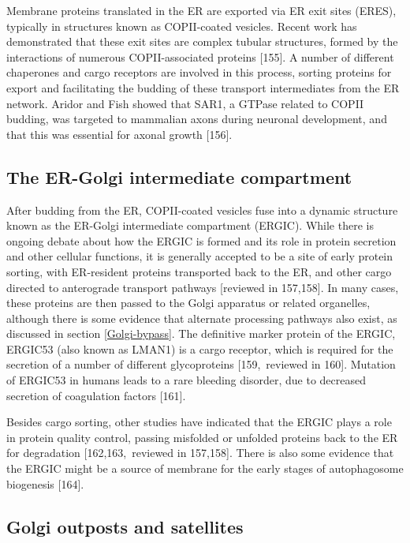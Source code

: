 \documentclass[
  12pt,
  a4paper,
]{book}
\begin{document}
Membrane proteins translated in the ER are exported via ER exit sites (ERES), typically in structures known as COPII-coated vesicles. Recent work has demonstrated that these exit sites are complex tubular structures, formed by the interactions of numerous COPII-associated proteins {[}155{]}. A number of different chaperones and cargo receptors are involved in this process, sorting proteins for export and facilitating the budding of these transport intermediates from the ER network. Aridor and Fish showed that SAR1, a GTPase related to COPII budding, was targeted to mammalian axons during neuronal development, and that this was essential for axonal growth {[}156{]}.

\subsection{The ER-Golgi intermediate compartment}\label{the-er-golgi-intermediate-compartment}

After budding from the ER, COPII-coated vesicles fuse into a dynamic structure known as the ER-Golgi intermediate compartment (ERGIC). While there is ongoing debate about how the ERGIC is formed and its role in protein secretion and other cellular functions, it is generally accepted to be a site of early protein sorting, with ER-resident proteins transported back to the ER, and other cargo directed to anterograde transport pathways {[}reviewed in 157,158{]}. In many cases, these proteins are then passed to the Golgi apparatus or related organelles, although there is some evidence that alternate processing pathways also exist, as discussed in section \ref{Golgi-bypass}. The definitive marker protein of the ERGIC, ERGIC53 (also known as LMAN1) is a cargo receptor, which is required for the secretion of a number of different glycoproteins {[}159,~reviewed in 160{]}. Mutation of ERGIC53 in humans leads to a rare bleeding disorder, due to decreased secretion of coagulation factors {[}161{]}.

Besides cargo sorting, other studies have indicated that the ERGIC plays a role in protein quality control, passing misfolded or unfolded proteins back to the ER for degradation {[}162,163,~reviewed in 157,158{]}. There is also some evidence that the ERGIC might be a source of membrane for the early stages of autophagosome biogenesis {[}164{]}.

\subsection{Golgi outposts and satellites}\label{golgi-outposts-and-satellites}
\end{document}
